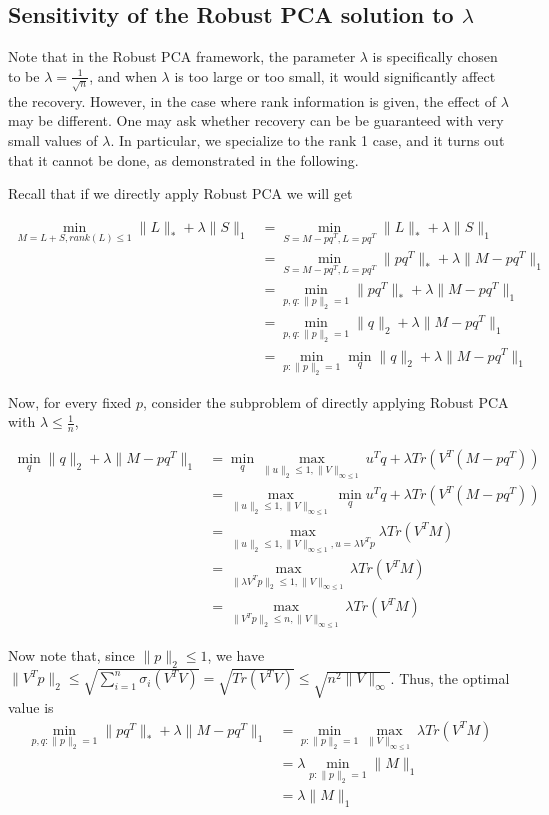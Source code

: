 \subsection{Sensitivity of the Robust PCA solution to $\lambda$}

Note that in the Robust PCA framework, the parameter $\lambda$ is specifically chosen to be $\lambda = \frac{1}{\sqrt{n}}$, and when $\lambda$ is too large or too small, it would significantly affect the recovery. However, in the case where rank information is given, the effect of $\lambda$ may be different. One may ask whether recovery can be be guaranteed with very small values of $\lambda$. In particular, we specialize to the rank 1 case, and it turns out that it cannot be done, as demonstrated in the following.

Recall that if we directly apply Robust PCA we will get

\begin{align*}
 \min_{M=L+S,rank(L)\le1}\|L\|_{*}+\lambda\|S\|_{1}
 & = \min_{S=M-pq^{T},L=pq^{T}}\|L\|_{*}+\lambda\|S\|_{1} \\
 & = \min_{S=M-pq^{T},L=pq^{T}}\|pq^{T}\|_{*}+\lambda\|M-pq^{T}\|_{1} \\
 & = \min_{p,q:\|p\|_{2}=1}\|pq^{T}\|_{*}+\lambda\|M-pq^{T}\|_{1} \\
 & = \min_{p,q:\|p\|_{2}=1}\|q\|_{2}+\lambda\|M-pq^{T}\|_{1} \\
 & = \min_{p:\|p\|_{2}=1}\min_{q}\|q\|_{2}+\lambda\|M-pq^{T}\|_{1}
\end{align*}


Now, for every fixed $p$, consider the subproblem of directly
applying Robust PCA with $\lambda\le\frac{1}{n}$,

\begin{align*}
\min_{q}\|q\|_{2}+\lambda\|M-pq^{T}\|_{1}
& = \min_{q}\max_{\|u\|_{2}\le1,\|V\|_{\infty\le1}}u^{T}q+\lambda Tr(V^{T}(M-pq^{T})) \\
& = \max_{\|u\|_{2}\le1,\|V\|_{\infty\le1}}\min_{q}u^{T}q+\lambda Tr(V^{T}(M-pq^{T})) \\
& = \max_{\|u\|_{2}\le1,\|V\|_{\infty\le1},u=\lambda V^{T}p} \lambda Tr(V^{T}M) \\
& = \max_{\|\lambda V^{T}p\|_{2}\le1,\|V\|_{\infty\le1}} \lambda Tr(V^{T}M) \\
& = \max_{\|V^{T}p\|_{2}\le n,\|V\|_{\infty\le1}} \lambda Tr(V^{T}M)
\end{align*}


Now note that, since $\|p\|_{2}\le1$, we have $\|V^{T}p\|_{2}\le\sqrt{\sum_{i=1}^{n}\sigma_{i}(V^{T}V)}=\sqrt{Tr(V^{T}V)}\le\sqrt{n^{2}\|V\|_{\infty}}$.
Thus, the optimal value is
\begin{align*}
\min_{p,q:\|p\|_{2}=1}\|pq^{T}\|_{*}+\lambda\|M-pq^{T}\|_{1}
& = \min_{p:\|p\|_{2}=1}\max_{\|V\|_{\infty\le1}}\lambda Tr(V^{T}M)\\
& = \lambda \min_{p:\|p\|_{2}=1}\|M\|_{1}\\
& = \lambda \|M\|_{1}
\end{align*}


